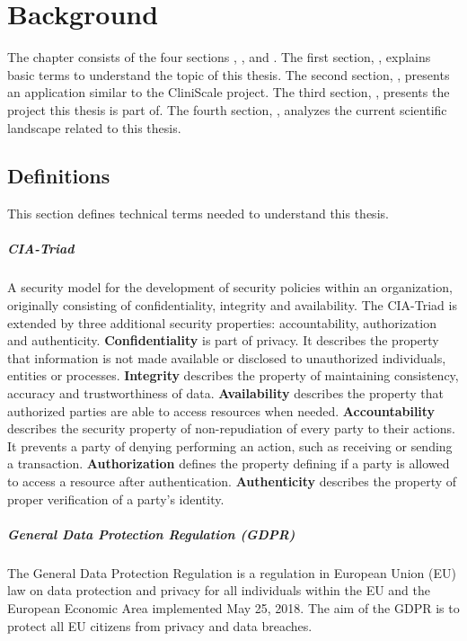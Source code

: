 \chapter{Background}
\label{background}

The chapter \textit{} consists of the four sections \textit{}, \textit{}, \textit{} and \textit{}. The first section, \textit{}, explains basic terms to understand the topic of this thesis. The second section, \textit{}, presents an application similar to the CliniScale project. The third section, \textit{}, presents the project this thesis is part of. The fourth section, \textit{}, analyzes the current scientific landscape related to this thesis.


\section{Definitions}
\label{definition}
This section defines technical terms needed to understand this thesis.

\label{ciatriad}
\paragraph{CIA-Triad} A security model for the development of security policies within an organization, originally consisting of confidentiality, integrity and availability. The CIA-Triad is extended by three additional security properties: accountability, authorization and authenticity. 
\textbf{Confidentiality} is part of privacy. It describes the property that information is not made available or disclosed to unauthorized individuals, entities or processes. 
\textbf{Integrity} describes the property of maintaining consistency, accuracy and trustworthiness of data. 
\textbf{Availability} describes the property that authorized parties are able to access resources when needed. 
\textbf{Accountability} describes the security property of non-repudiation of every party to their actions. It prevents a party of denying performing an action, such as receiving or sending a transaction. 
\textbf{Authorization} defines the property defining if a party is allowed to access a resource after authentication. 
\textbf{Authenticity} describes the property of proper verification of a party's identity.


\paragraph{\textbf{General Data Protection Regulation (GDPR)}} The General Data Protection Regulation is a regulation in European Union (EU) law on data protection and privacy for all individuals within the EU and the European Economic Area implemented May 25, 2018\cite{GDPR}. The aim of the GDPR is to protect all EU citizens from privacy and data breaches. 


